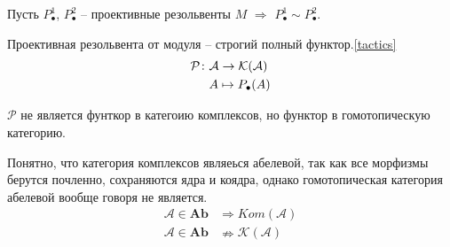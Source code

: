 \begin{to_con}
Пусть $P^1_\bullet$, $P^2_\bullet$ -- проективные резольвенты $M$ $\Rightarrow$ $P^1_\bullet \sim P^2_\bullet$. 
\end{to_con}
\begin{to_con}
Проективная резольвента от модуля -- строгий полный функтор.\ref{tactics}
    \begin{align*}
        \mathcal{P}\colon&\mathcal{A} \to\mathcal{K(A)}\\
         &A \mapsto P_\bullet(A)
    \end{align*}
\end{to_con}
\begin{to_com}
$\mathcal{P}$ не является фунткор в категоию комплексов, но функтор в гомотопическую категорию.
\end{to_com}
\begin{to_com}
Понятно, что категория комплексов являеься абелевой, так как все морфизмы берутся почленно, сохраняются ядра и коядра, однако гомотопическая категория абелевой вообще говоря не является.
\begin{align*}
    \mathcal{A} \in \mathbf{Ab}&\Rightarrow Kom\mathcal{(A)}\\
    \mathcal{A} \in \mathbf{Ab}&\nRightarrow \mathcal{K(A)}
\end{align*}
\end{to_com}
